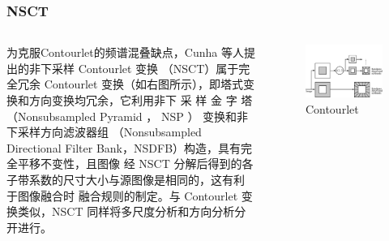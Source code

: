 \documentclass[10pt,aspectratio=43,mathserif]{beamer}
\begin{document}
    \begin{frame}
		  \frametitle{\textbf{NSCT}}
            \begin{columns}
                \footnotesize
                为克服Contourlet的频谱混叠缺点，Cunha 等人提出的非下采样 Contourlet 变换
（NSCT）属于完全冗余 Contourlet 变换（如右图所示），即塔式变换和方向变换均冗余，它利用非下
采 样 金 字 塔（Nonsubsampled Pyramid ， NSP ） 变换和非下采样方向滤波器组
（Nonsubsampled Directional Filter Bank，NSDFB）构造，具有完全平移不变性，且图像
经 NSCT 分解后得到的各子带系数的尺寸大小与源图像是相同的，这有利于图像融合时
融合规则的制定。与 Contourlet 变换类似，NSCT 同样将多尺度分析和方向分析分开进行。

                \begin{figure}[!t]
                    \centering
                    \includegraphics[width=1.1\textwidth]{./figures/nsct/NSCT-struct.png}
                    \caption{Contourlet}
                    \label{fig:CTandNSCT}
                \end{figure}
        \end{columns}
    \end{frame}
\end{document}
